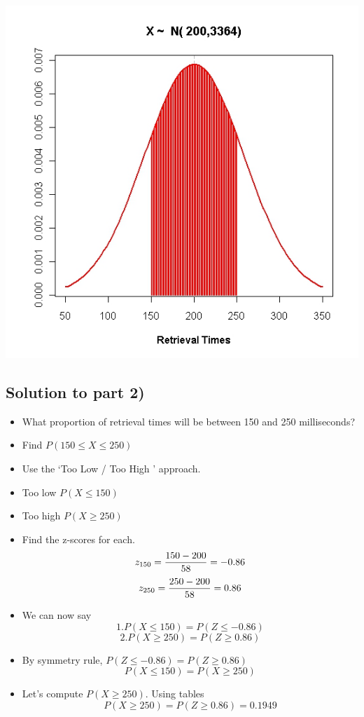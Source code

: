 ﻿\documentclass[]{report}
\begin{document}
	
	\begin{center}
		\includegraphics[scale=0.40]{images/5BNormal3}
	\end{center}

	
	\subsection{Solution to part 2)}
	\begin{itemize}
		\item What proportion of retrieval times will be between 150 and 250 milliseconds?
		\item Find $P(150 \leq X \leq 250)$
		\item Use the `Too Low / Too High ' approach.
		\item Too low $P( X \leq 150)$
		\item Too high $P( X \geq 250)$
		\item Find the z-scores for each.
		\[ z_{150} =  {150 - 200 \over 58}  = -0.86 \]
		\[ z_{250} =  {250 - 200 \over 58}  = 0.86 \]
	\end{itemize}

	
	\begin{itemize}
		\item We can now say
		\[ 1. P( X \leq 150) = P( Z \leq -0.86)\]
		\[ 2. P( X \geq 250) = P( Z \geq 0.86)\]
		\item By symmetry rule, $P( Z \leq -0.86) = P( Z \geq 0.86)$
		\[ P( X \leq 150) =  P( X \geq 250) \]
		\item Let's compute $P( X \geq 250)$. Using tables
		\[P( X \geq 250) = P( Z \geq 0.86) = 0.1949 \]
	\end{itemize}
\end{document}
